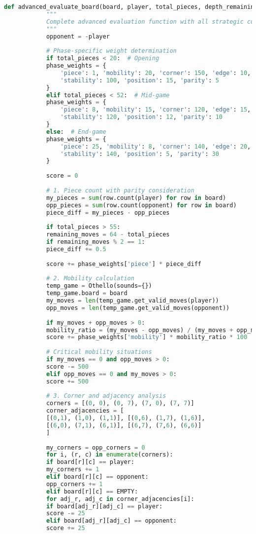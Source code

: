 \documentclass[12pt]{article}
\newenvironment{ltrcode}{\lr\bgroup}{\egroup}
\begin{document}
	\begin{ltrcode}
		\begin{lstlisting}[language=Python, caption=Complete Advanced Evaluation Function]
			def advanced_evaluate_board(board, player, total_pieces, depth_remaining=0):
			"""
			Complete advanced evaluation function with all strategic components
			"""
			opponent = -player
			
			# Phase-specific weight determination
			if total_pieces < 20:  # Opening
			phase_weights = {
				'piece': 1, 'mobility': 20, 'corner': 150, 'edge': 10,
				'stability': 100, 'position': 15, 'parity': 5
			}
			elif total_pieces < 52:  # Mid-game
			phase_weights = {
				'piece': 8, 'mobility': 15, 'corner': 120, 'edge': 15,
				'stability': 120, 'position': 12, 'parity': 10
			}
			else:  # End-game
			phase_weights = {
				'piece': 25, 'mobility': 8, 'corner': 140, 'edge': 20,
				'stability': 140, 'position': 5, 'parity': 30
			}
			
			score = 0
			
			# 1. Piece count with parity consideration
			my_pieces = sum(row.count(player) for row in board)
			opp_pieces = sum(row.count(opponent) for row in board)
			piece_diff = my_pieces - opp_pieces
			
			if total_pieces > 55:
			remaining_moves = 64 - total_pieces
			if remaining_moves % 2 == 1:
			piece_diff += 0.5
			
			score += phase_weights['piece'] * piece_diff
			
			# 2. Mobility calculation
			temp_game = Othello(sounds={})
			temp_game.board = board
			my_moves = len(temp_game.get_valid_moves(player))
			opp_moves = len(temp_game.get_valid_moves(opponent))
			
			if my_moves + opp_moves > 0:
			mobility_ratio = (my_moves - opp_moves) / (my_moves + opp_moves + 1)
			score += phase_weights['mobility'] * mobility_ratio * 100
			
			# Critical mobility situations
			if my_moves == 0 and opp_moves > 0:
			score -= 500
			elif opp_moves == 0 and my_moves > 0:
			score += 500
			
			# 3. Corner and adjacency analysis
			corners = [(0, 0), (0, 7), (7, 0), (7, 7)]
			corner_adjacencies = [
			[(0,1), (1,0), (1,1)], [(0,6), (1,7), (1,6)],
			[(6,0), (7,1), (6,1)], [(6,7), (7,6), (6,6)]
			]
			
			my_corners = opp_corners = 0
			for i, (r, c) in enumerate(corners):
			if board[r][c] == player:
			my_corners += 1
			elif board[r][c] == opponent:
			opp_corners += 1
			elif board[r][c] == EMPTY:
			for adj_r, adj_c in corner_adjacencies[i]:
			if board[adj_r][adj_c] == player:
			score -= 25
			elif board[adj_r][adj_c] == opponent:
			score += 25
			

\end{lstlisting}
\end{ltrcode}
\end{document}
